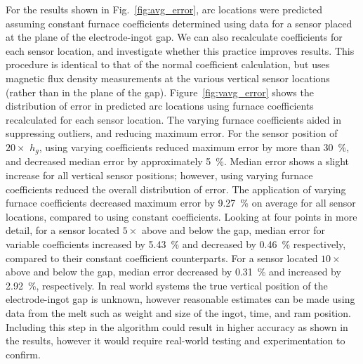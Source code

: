 \documentclass[onehalf,11pt]{beavtex}
\begin{document}
For the results shown in Fig.~\ref{fig:avg_error}, arc locations were predicted assuming constant furnace coefficients determined using data for a sensor placed at the plane of the electrode-ingot gap.
We can also recalculate coefficients for each sensor location, and investigate whether this practice improves results. 
This procedure is identical to that of the normal coefficient calculation, but uses magnetic flux density measurements at the various vertical sensor locations (rather than in the plane of the gap).
Figure~\ref{fig:vavg_error} shows the distribution of error in predicted arc locations using furnace coefficients recalculated for each sensor location.
The varying furnace coefficients aided in suppressing outliers, and reducing maximum error.
For the sensor position of $20 \times$ $h_g$, using varying coefficients reduced maximum error by more than \SI{30}{\percent}, and decreased median error by approximately \SI{5}{\percent}.
Median error shows a slight increase for all vertical sensor positions; however, using varying furnace coefficients reduced the overall distribution of error. 
The application of varying furnace coefficients decreased maximum error by \SI{9.27}{\percent} on average for all sensor locations, compared to using constant coefficients.
Looking at four points in more detail, for a sensor located $5 \times$ above and below the gap, median error for variable coefficients increased by \SI{5.43}{\percent} and decreased by \SI{0.46}{\percent} respectively, compared to their constant coefficient counterparts. 
For a sensor located $10 \times$ above and below the gap, median error decreased by \SI{0.31}{\percent} and increased by \SI{2.92}{\percent}, respectively. 
In real world systems the true vertical position of the electrode-ingot gap is unknown, however reasonable estimates can be made using data from the melt such as weight and size of the ingot, time, and ram position. 
Including this step in the algorithm could result in higher accuracy as shown in the results, however it would require real-world testing and experimentation to confirm. 


\end{document}
